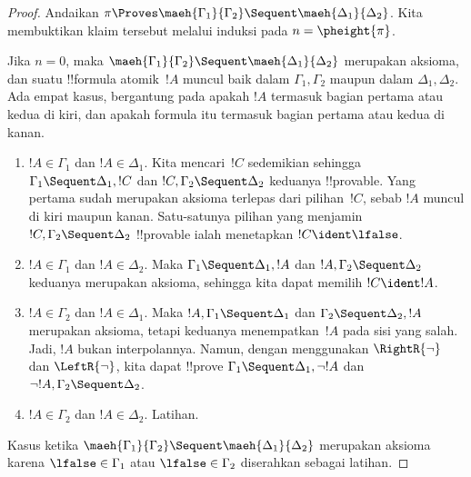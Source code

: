 \documentclass[../../../include/open-logic-section]{subfiles}
\begin{document}
\begin{proof}
  Andaikan $\pi \Proves \maeh{\Gamma_1}{\Gamma_2} \Sequent
  \maeh{\Delta_1}{\Delta_2}$. Kita membuktikan klaim tersebut melalui
  induksi pada $n=\pheight{\pi}$.

  Jika $n=0$, maka $\maeh{\Gamma_1}{\Gamma_2} \Sequent
  \maeh{\Delta_1}{\Delta_2}$ merupakan aksioma, dan suatu !!{formula}
  atomik~$!A$ muncul baik dalam $\Gamma_1, \Gamma_2$ maupun dalam
  $\Delta_1, \Delta_2$. Ada empat kasus, bergantung pada apakah $!A$
  termasuk bagian pertama atau kedua di kiri, dan apakah formula itu termasuk
  bagian pertama atau kedua di kanan.
  \begin{enumerate}
    \item $!A \in \Gamma_1$ dan $!A \in \Delta_1$. Kita mencari~$!C$
    sedemikian sehingga $\Gamma_1 \Sequent \Delta_1, !C$ dan $!C, \Gamma_2
    \Sequent \Delta_2$ keduanya !!{provable}. Yang pertama sudah merupakan
    aksioma terlepas dari pilihan~$!C$, sebab $!A$ muncul di kiri maupun
    kanan. Satu-satunya pilihan yang menjamin $!C, \Gamma_2 \Sequent
    \Delta_2$ !!{provable} ialah menetapkan $!C \ident \lfalse$.
    \item $!A \in \Gamma_1$ dan $!A \in \Delta_2$. Maka $\Gamma_1
    \Sequent \Delta_1, !A$ dan $!A, \Gamma_2 \Sequent \Delta_2$ keduanya
    merupakan aksioma, sehingga kita dapat memilih $!C \ident !A$.
    \item $!A \in \Gamma_2$ dan $!A \in \Delta_1$. Maka $!A, \Gamma_1
    \Sequent \Delta_1$ dan $\Gamma_2 \Sequent \Delta_2, !A$ merupakan
    aksioma, tetapi keduanya menempatkan~$!A$ pada sisi yang salah. Jadi,
    $!A$ bukan interpolannya. Namun, dengan menggunakan $\RightR{\lnot}$
    dan $\LeftR{\lnot}$, kita dapat !!{prove} $\Gamma_1 \Sequent
    \Delta_1, \lnot!A$ dan $\lnot !A, \Gamma_2 \Sequent \Delta_2$.
    \item $!A \in \Gamma_2$ dan $!A \in \Delta_2$. Latihan.
  \end{enumerate}
  Kasus ketika $\maeh{\Gamma_1}{\Gamma_2} \Sequent
  \maeh{\Delta_1}{\Delta_2}$ merupakan aksioma karena $\lfalse \in
  \Gamma_1$ atau $\lfalse \in \Gamma_2$ diserahkan sebagai latihan.


\end{proof}
\end{document}
